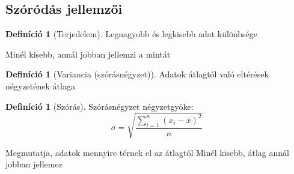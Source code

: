 \documentclass[twoside,12pt]{report}
\theoremstyle{definition}
\newtheorem{definition}[theorem]{Definíció}
\begin{document}
	\subsection{Szóródás jellemzői}
	\begin{outline}
		\1[] \begin{definition}[Terjedelem]
				Legnagyobb és legkisebb adat különbsége
			\end{definition}
			\2 Minél kisebb, annál jobban jellemzi a mintát
		\1[] \begin{definition}[Variancia (szórásnégyzet)]
				Adatok átlagtól való eltérések négyzetének átlaga
			\end{definition}
		\1[] \begin{definition}[Szórás]
				Szórásnégyzet négyzetgyöke:
				\begin{equation*}
					\sigma=\sqrt{\frac{\sum_{i=1}^{n}\left(x_i-\overline{x}\right)^2}{n}}
				\end{equation*}
			\end{definition}
			\2 Megmutatja, adatok mennyire térnek el az átlagtól
			\2 Minél kisebb, átlag annál jobban jellemez
	\end{outline}
\end{document}
